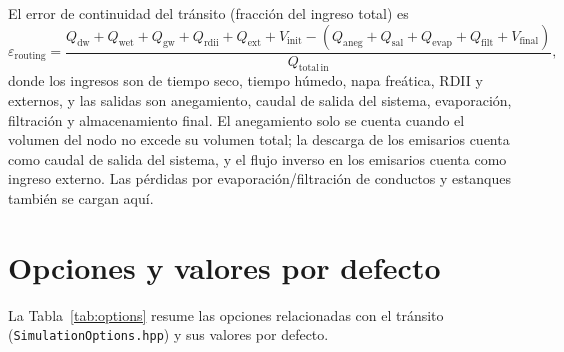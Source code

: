 \documentclass[11pt,a4paper]{article}
\begin{document}
El error de continuidad del tránsito (fracción del ingreso total) es
\begin{equation}
  \varepsilon_{\mathrm{routing}} = \frac{Q_{\mathrm{dw}} + Q_{\mathrm{wet}} +
    Q_{\mathrm{gw}} + Q_{\mathrm{rdii}} + Q_{\mathrm{ext}} +
    V_{\mathrm{init}} - \left(Q_{\mathrm{aneg}} + Q_{\mathrm{sal}} +
    Q_{\mathrm{evap}} + Q_{\mathrm{filt}} + V_{\mathrm{final}}\right)}
    {Q_{\mathrm{total\,in}}},
\end{equation}
donde los ingresos son de tiempo seco, tiempo húmedo, napa freática, RDII y
externos, y las salidas son anegamiento, caudal de salida del sistema,
evaporación, filtración y almacenamiento final. El anegamiento solo se cuenta
cuando el volumen del nodo no excede su volumen total; la descarga de los
emisarios cuenta como caudal de salida del sistema, y el flujo inverso en los
emisarios cuenta como ingreso externo. Las pérdidas por evaporación/filtración
de conductos y estanques también se cargan aquí.

\section{Opciones y valores por defecto}

La Tabla~\ref{tab:options} resume las opciones relacionadas con el tránsito
(\texttt{SimulationOptions.hpp}) y sus valores por defecto.
\end{document}
